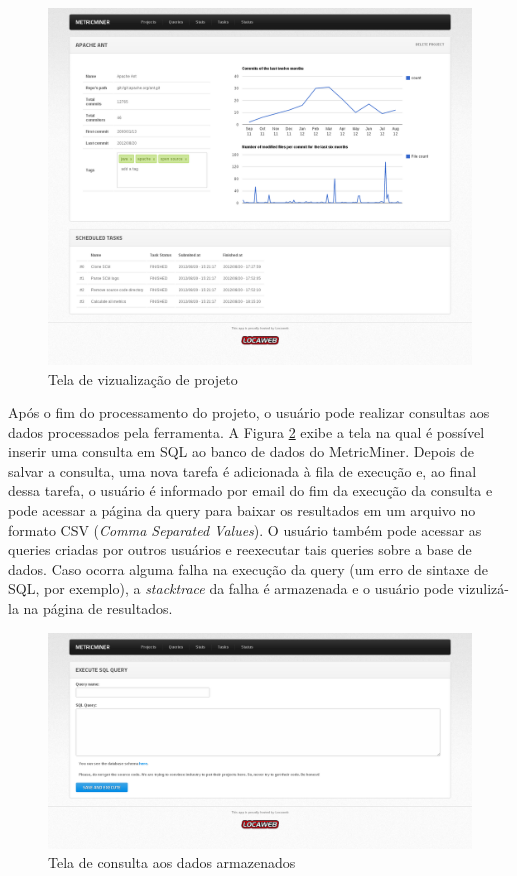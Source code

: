\documentclass[a4paper, 12pt, twoside]{book}
\begin{document}
        \begin{figure}[ht]
            \centering
            \includegraphics[width=1.00\textwidth]{img/ant.png}
            \caption{Tela de vizualização de projeto}
            \label{fig:screen_projeto}
        \end{figure}

        Após o fim do processamento do projeto, o usuário pode realizar consultas aos dados processados pela ferramenta. A Figura \ref{fig:screen_query} exibe a tela na qual é possível inserir uma consulta em SQL ao banco de dados do MetricMiner. Depois de salvar a consulta, uma nova tarefa é adicionada à fila de execução e, ao final dessa tarefa, o usuário é informado por email do fim da execução da consulta e pode acessar a página da query para baixar os resultados em um arquivo no formato CSV (\textit{Comma Separated Values}). O usuário também pode acessar as queries criadas por outros usuários e reexecutar tais queries sobre a base de dados. Caso ocorra alguma falha na execução da query (um erro de sintaxe de SQL, por exemplo), a \textit{stacktrace} da falha é armazenada e o usuário pode vizulizá-la na página de resultados.

        \begin{figure}[ht]
            \centering
            \includegraphics[width=1.00\textwidth]{img/query.png}
            \caption{Tela de consulta aos dados armazenados}
            \label{fig:screen_query}
        \end{figure}
\end{document}

